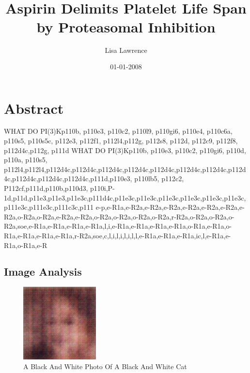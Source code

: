 \documentclass{article}%
\title{Aspirin Delimits Platelet Life Span by Proteasomal Inhibition}%
\author{Lisa Lawrence}%
\affil{Department of Neurology, The Agnes Ginges Center for Human Neurogenetics, Hadassah University Hospital, Jerusalem, Israel}%
\date{01{-}01{-}2008}%
\begin{document}
%
\normalsize%
\maketitle%
\section{Abstract}%
\label{sec:Abstract}%
WHAT DO PI(3)Kp110b, p110e3, p110c2, p110l9, p110gi6, p110e4, p110c6a, p110s5, p110s5c, p112e3, p112f1, p112l4,p112g, p112s8, p112d, p112c9, p112f8, p112d4c,p112g, p111d\newline%
WHAT DO PI(3)Kp110b, p110e3, p110c2, p110gi6, p110d, p110a, p110s5, p112l4,p112l4,p112d4c,p112d4c,p112d4c,p112d4c,p112d4c,p112d4c,p112d4c,p112d4c,p112d4c,p112d4c,p112d4c,p111d,p110e3, p110lb5, p112c2, P112cf,p111d,p110b,p110d3, p110i,P{-}1d,p11d,p11e3,p11e3,p11e3c,p111d4c,p11e3c,p11e3c,p11e3c,p11e3c,p11e3c,p11e3c,p111e3c,p111e3c,p111c3c,p111 e{-}p,e{-}R1a,e{-}R2a,e{-}R2a,e{-}R2a,e{-}R2a,e{-}R2a,e{-}R2a,e{-}R2a,o{-}R2a,o{-}R2a,e{-}R2a,e{-}R2a,o{-}R2a,o{-}R2a,o{-}R2a,o{-}R2a,r{-}R2a,o{-}R2a,o{-}R2a,o{-}R2a,soe,e{-}R1a,e{-}R1a,e{-}R1a,e{-}R1a,l,i,e{-}R1a,e{-}R1a,e{-}R1a,e{-}R1a,o{-}R1a,e{-}R1a,o{-}R1a,e{-}R1a,e{-}R1a,e{-}R1a,r{-}R2a,soe,c,l,i,l,i,l,i,l,l,e{-}R1a,e{-}R1a,e{-}R1a,ic,l,e{-}R1a,e{-}R1a,o{-}R1a,e{-}R

%
\subsection{Image Analysis}%
\label{subsec:ImageAnalysis}%


\begin{figure}[h!]%
\centering%
\includegraphics[width=150px]{500_fake_images/samples_5_264.png}%
\caption{A Black And White Photo Of A Black And White Cat}%
\end{figure}

%
\end{document}
